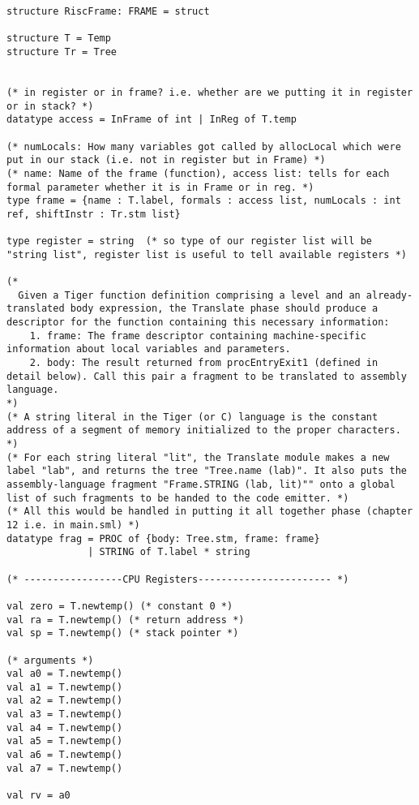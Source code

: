 \begin{verbatim}
structure RiscFrame: FRAME = struct

structure T = Temp
structure Tr = Tree


(* in register or in frame? i.e. whether are we putting it in register or in stack? *)
datatype access = InFrame of int | InReg of T.temp

(* numLocals: How many variables got called by allocLocal which were put in our stack (i.e. not in register but in Frame) *)
(* name: Name of the frame (function), access list: tells for each formal parameter whether it is in Frame or in reg. *)
type frame = {name : T.label, formals : access list, numLocals : int ref, shiftInstr : Tr.stm list}

type register = string  (* so type of our register list will be "string list", register list is useful to tell available registers *)

(* 
  Given a Tiger function definition comprising a level and an already-translated body expression, the Translate phase should produce a descriptor for the function containing this necessary information: 
    1. frame: The frame descriptor containing machine-specific information about local variables and parameters. 
    2. body: The result returned from procEntryExit1 (defined in detail below). Call this pair a fragment to be translated to assembly language. 
*)
(* A string literal in the Tiger (or C) language is the constant address of a segment of memory initialized to the proper characters. *)
(* For each string literal "lit", the Translate module makes a new label "lab", and returns the tree "Tree.name (lab)". It also puts the  assembly-language fragment "Frame.STRING (lab, lit)"" onto a global list of such fragments to be handed to the code emitter. *)
(* All this would be handled in putting it all together phase (chapter 12 i.e. in main.sml) *)
datatype frag = PROC of {body: Tree.stm, frame: frame}
              | STRING of T.label * string

(* -----------------CPU Registers----------------------- *)

val zero = T.newtemp() (* constant 0 *)
val ra = T.newtemp() (* return address *)
val sp = T.newtemp() (* stack pointer *)

(* arguments *)
val a0 = T.newtemp()
val a1 = T.newtemp()
val a2 = T.newtemp()
val a3 = T.newtemp()
val a4 = T.newtemp()
val a5 = T.newtemp()
val a6 = T.newtemp()
val a7 = T.newtemp()

val rv = a0


\end{verbatim}
